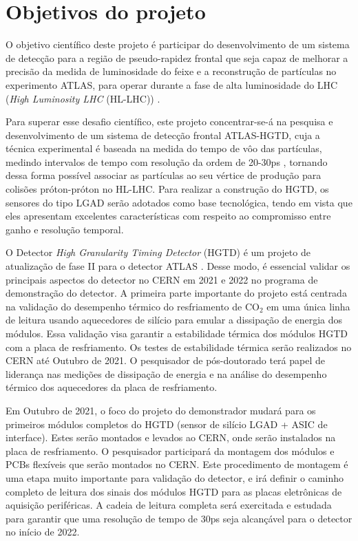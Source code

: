 
\chapter{Objetivos do projeto}

O objetivo científico deste projeto é participar do desenvolvimento de um sistema de detecção para a região de pseudo-rapidez frontal que seja capaz de melhorar a precisão da medida de luminosidade do feixe e a reconstrução de partículas no experimento ATLAS, para operar durante a fase de alta luminosidade do LHC ({\it High Luminosity LHC} (HL-LHC)) \cite{HL_LHC,tdr}. 

Para superar esse desafio científico, este projeto concentrar-se-á na pesquisa e desenvolvimento de um sistema de detecção frontal ATLAS-HGTD, cuja a técnica experimental é baseada na medida do tempo de vôo das partículas, medindo intervalos de tempo com resolução da ordem de 20-30ps \cite{tdr}, tornando dessa forma possível associar as partículas ao seu vértice de produção para colisões próton-próton no HL-LHC. Para realizar a construção do HGTD, os sensores do tipo LGAD serão adotados como base tecnológica, tendo em vista que eles apresentam excelentes características com respeito ao compromisso entre ganho e resolução temporal. 
\thispagestyle{plain}

O Detector \textit{High Granularity Timing Detector} (HGTD) é um projeto de atualização de fase II para o detector ATLAS \cite{tdr}. Desse modo, é essencial validar os principais aspectos do detector no CERN em 2021 e 2022 no programa de demonstração do detector. A primeira parte importante do projeto está centrada na validação do desempenho térmico do resfriamento de CO$_{2}$ em uma única linha de leitura usando aquecedores de silício para emular a dissipação de energia dos módulos. Essa validação visa garantir a estabilidade térmica dos módulos HGTD com a placa de resfriamento. Os testes de estabilidade térmica serão realizados no CERN até Outubro de 2021. O pesquisador de pós-doutorado terá papel de liderança nas medições de dissipação de energia e na análise do desempenho térmico dos aquecedores da placa de resfriamento.
\thispagestyle{plain}

Em Outubro de 2021, o foco do projeto do demonstrador mudará para os primeiros módulos completos do HGTD (sensor de silício LGAD + ASIC de interface). Estes serão montados e levados ao CERN, onde serão instalados na placa de resfriamento. O pesquisador participará da montagem dos módulos e PCBs flexíveis que serão montados no CERN. Este procedimento de montagem é uma etapa muito importante para validação do detector, e irá definir o caminho completo de leitura dos sinais dos módulos HGTD para as placas eletrônicas de aquisição periféricas. A cadeia de leitura completa será exercitada e estudada para garantir que uma resolução de tempo de 30ps seja alcançável para o detector no início de 2022.

